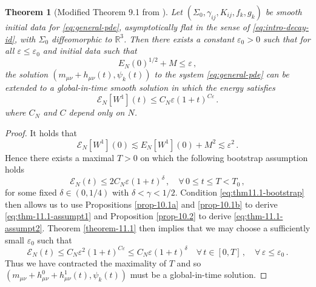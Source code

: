 \documentclass[11pt, a4paper]{amsart}
\numberwithin{equation}{section}
\newtheorem{theorem}{Theorem}
\numberwithin{theorem}{section}
\newcommand{\R}{\mathbb{R}}
\newcommand{\mn}{{\mu \nu}}
\begin{document}
\begin{theorem}[Modified Theorem 9.1 from \cite{LR:04}] \label{thm-9.1}Let $( \Sigma_0,\gamma_{ij}, K_{ij}, f_k, g_k)$ be smooth initial data for \eqref{eq:general-pde},  asymptotically flat in the sense of \eqref{eq:intro-decay-id}, with $\Sigma_0$ diffeomorphic to $\R^3$. Then there exists a constant $\varepsilon_0>0$ such that for all $\varepsilon \leq \varepsilon_0$ and initial data such that 
$$ E_N (0)^{1/2} + M \leq \varepsilon \,, $$
the solution $(m_\mn + h_\mn(t), \psi_k(t))$ to the system \eqref{eq:general-pde} can be extended to a global-in-time smooth solution  in which the energy satisfies
\begin{equation} \mathcal{E}_N[W^1](t) \leq C_N \varepsilon (1+t)^{C \varepsilon} \,.  \end{equation}
where $C_N$ and $C$ depend only on $N$.
\end{theorem}
\begin{proof}
It holds that
$$ \mathcal{E}_N[W^1](0) \lesssim E_N[W^1](0) + M^2 \lesssim \varepsilon^2 \,. $$
Hence there exists a maximal $T>0$ on which the following bootstrap assumption holds 
\begin{equation} \mathcal{E}_N(t) \leq 2 C_N \varepsilon (1+t)^\delta \,, \quad \forall \, 0 \leq t \leq T < T_0 \,, \label{eq:thm11.1-bootstrap} \end{equation}
for some fixed $\delta \in (0, 1/4)$ with $\delta < \gamma<1/2$.
Condition \eqref{eq:thm11.1-bootstrap} then allows us to use Propositions \ref{prop-10.1a} and \ref{prop-10.1b} to derive \eqref{eq:thm-11.1-assumpt1} and Proposition \ref{prop-10.2} to derive \eqref{eq:thm-11.1-assumpt2}. 
Theorem \ref{theorem-11.1} then implies that we may choose a sufficiently small $\varepsilon_0$ such that 
$$ \mathcal{E}_N (t) \leq C_N \varepsilon^2 (1+t)^{C \varepsilon} \leq C_N \varepsilon (1+t)^\delta \quad \forall \, t \in [0, T] \,, \quad \forall \, \varepsilon \leq \varepsilon_0 \,.$$
Thus we have contracted the maximality of $T$ and so $(m_\mn + h^0_\mn + h^1_\mn(t), \psi_k(t))$ must be a global-in-time solution.
\end{proof}
\appendix
\end{document}
